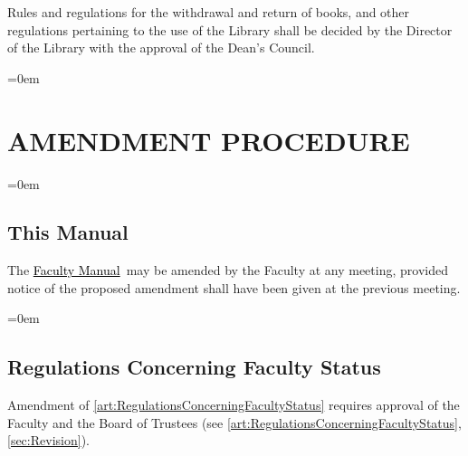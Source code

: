 \documentclass{manual}
\let\stdsection\section %
\renewcommand\section{\newpage\stdsection}
\newcommand{\keyword}[1]{\textcolor{black}{#1}}
\newcommand{\facman}{\keyword{\underline{Faculty Manual}}~}
\let\oldsection\section
\renewcommand\section{\leftskip=0em\oldsection}
\let\oldsubsection\subsection
\renewcommand\subsection{\leftskip=0em\oldsubsection}
\begin{document}
			Rules and regulations for the withdrawal and return of books, and other regulations pertaining to the use of the Library shall be decided by the Director of the Library with the approval of the Dean's Council.

\section{AMENDMENT PROCEDURE}\label{art:Amendment}

	\subsection{This Manual}
	The \facman may be amended by the Faculty at any meeting, provided notice of the proposed amendment shall have been given at the previous meeting.

	\subsection{Regulations Concerning Faculty Status}
	Amendment of \cref{art:RegulationsConcerningFacultyStatus} requires approval of the Faculty and the Board of Trustees (see \cref{art:RegulationsConcerningFacultyStatus}, \cref{sec:Revision}).
\end{document}
